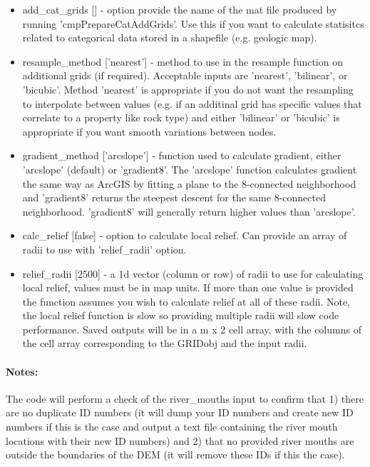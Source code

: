 \begin{itemize}
\item add\_cat\_grids [] - option provide the name of the mat file produced by running 'cmpPrepareCatAddGrids'. Use this if you want to calculate statisitcs
related to categorical data stored in a shapefile (e.g. geologic map).
\item resample\_method ['nearest'] - method to use in the resample function on additional grids (if required). Acceptable inputs are 'nearest', 'bilinear', 
or 'bicubic'. Method 'nearest' is appropriate if you do not want the resampling to interpolate between values (e.g. if an additinal grid has specific values
that correlate to a property like rock type) and either 'bilinear' or 'bicubic' is appropriate if you want smooth variations between nodes. 
\item gradient\_method ['arcslope'] - function used to calculate gradient, either 'arcslope' (default) or 'gradient8'. The 'arcslope' function calculates
gradient the same way as ArcGIS by fitting a plane to the 8-connected neighborhood and 'gradient8' returns the steepest descent for the same
8-connected neighborhood. 'gradient8' will generally return higher values than 'arcslope'.
\item calc\_relief [false] - option to calculate local relief. Can provide an array of radii to use with 'relief\_radii' option.
\item relief\_radii [2500] - a 1d vector (column or row) of radii to use for calculating local relief, values must be in map units. If more than one value is provided
the function assumes you wish to calculate relief at all of these radii. Note, the local relief function is slow so providing multiple radii will
slow code performance. Saved outputs will be in a m x 2 cell array, with the columns of the cell array corresponding to the GRIDobj and the input radii.
\end{itemize}

\paragraph{Notes:}
The code will perform a check of the river\_mouths input to confirm that 1) there are no duplicate ID numbers (it will dump your ID numbers and create new
ID numbers if this is the case and output a text file containing the river mouth locations with their new ID numbers) and 2) that no provided river mouths 
are outside the boundaries of the DEM (it will remove these IDs if this the case).

